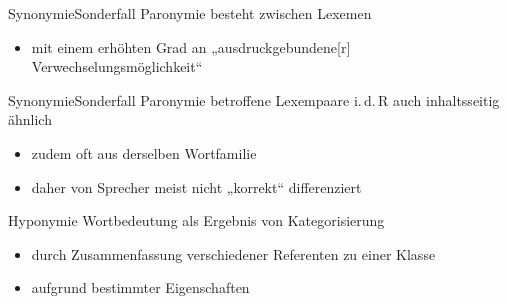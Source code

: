 \begin{frame}{Synonymie}{Sonderfall Paronymie}
\onslide<+->
besteht zwischen Lexemen
\Halbzeile
\begin{itemize}[<+->]
	\item		mit einem erhöhten Grad an „ausdruckgebundene[r] Verwechselungsmöglichkeit“ \citep[1120]{Hausmann1990}
\end{itemize}
\onslide<+->
\Zeile
\begin{exe}
	\ex\label{ex:synonymie-010}
    \begin{xlist}
		 \onslide<+->
		 \onslide<+->
	\end{xlist}
\end{exe}
\end{frame}

\begin{frame}{Synonymie}{Sonderfall Paronymie}
\onslide<+->
betroffene Lexempaare i.\,d.\,R auch inhaltsseitig ähnlich
\Halbzeile
\begin{itemize}[<+->]
	\item		zudem oft aus derselben Wortfamilie
	\item		daher von Sprecher meist nicht „korrekt“ differenziert
\end{itemize}
\onslide<+->
\Zeile
\begin{exe}
\end{exe}
\end{frame}

\begin{frame}{Hyponymie}
\onslide<+->
Wortbedeutung als Ergebnis von Kategorisierung
\Halbzeile
\begin{itemize}[<+->]
	\item		durch Zusammenfassung verschiedener Referenten zu einer Klasse
	\item		aufgrund bestimmter Eigenschaften
\end{itemize}
\onslide<+->
\Zeile
\begin{exe}
	\ex\label{ex:hyponymie-001}
    \begin{xlist}
		 \onslide<+->
		 \onslide<+->
	\end{xlist}
\end{exe}
\end{frame}

